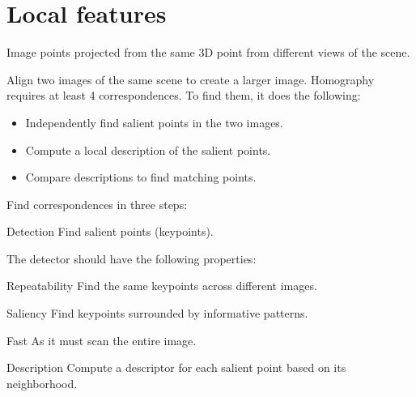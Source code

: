 \chapter{Local features}

\begin{description}
    \item[Correspondence points] 
        Image points projected from the same 3D point from different views of the scene.

        \begin{example}[Homography]
            Align two images of the same scene to create a larger image.
            Homography requires at least 4 correspondences. 
            To find them, it does the following:
            \begin{itemize}
                \item Independently find salient points in the two images.
                \item Compute a local description of the salient points.
                \item Compare descriptions to find matching points.
            \end{itemize}
        \end{example}


    \item[Local invariant features] 
        Find correspondences in three steps:
        \begin{descriptionlist}
            \item[Detection] 
                Find salient points (keypoints).
            
                The detector should have the following properties:
                \begin{descriptionlist}
                    \item[Repeatability] Find the same keypoints across different images.
                    \item[Saliency] Find keypoints surrounded by informative patterns.
                    \item[Fast] As it must scan the entire image. 
                \end{descriptionlist}
            

            \item[Description] 
                Compute a descriptor for each salient point based on its neighborhood.
            

\end{descriptionlist}
\end{description}
